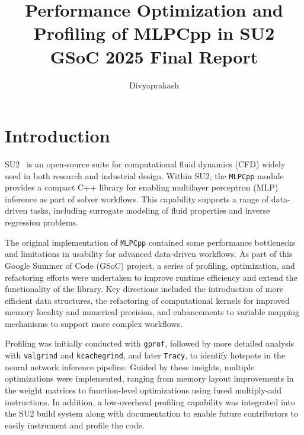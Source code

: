 \documentclass{article}
\title{Performance Optimization and Profiling of MLPCpp in SU2 \\ GSoC 2025 Final Report}
\author{Divyaprakash}
\begin{document}
\maketitle


\section{Introduction}
\label{sec:intro}

SU2~\cite{economon2016su2} is an open-source suite for computational fluid dynamics (CFD) widely used in both research and 
industrial design. Within SU2, the \texttt{MLPCpp} module provides a compact C++ library for enabling 
multilayer perceptron (MLP) inference as part of solver workflows. This capability supports a range of 
data-driven tasks, including surrogate modeling of fluid properties and inverse regression problems.

The original implementation of \texttt{MLPCpp} contained some performance 
bottlenecks and limitations in usability for advanced data-driven workflows. As part of this Google Summer of Code (GSoC) project, a series of profiling, optimization, and refactoring efforts were undertaken to improve runtime efficiency 
and extend the functionality of the library. Key directions included the introduction of more efficient data 
structures, the refactoring of computational kernels for improved memory locality and numerical precision, 
and enhancements to variable mapping mechanisms to support more complex workflows. 

Profiling was initially conducted with \texttt{gprof}, followed by more detailed analysis with 
\texttt{valgrind} and \texttt{kcachegrind}, and later \texttt{Tracy}, to identify hotspots in the neural 
network inference pipeline. Guided by these insights, multiple optimizations were implemented, ranging 
from memory layout improvements in the weight matrices to function-level optimizations using fused 
multiply-add instructions. In addition, a low-overhead profiling capability was integrated into the SU2 
build system along with documentation to enable future contributors to easily instrument and profile 
the code. 

\end{document}
